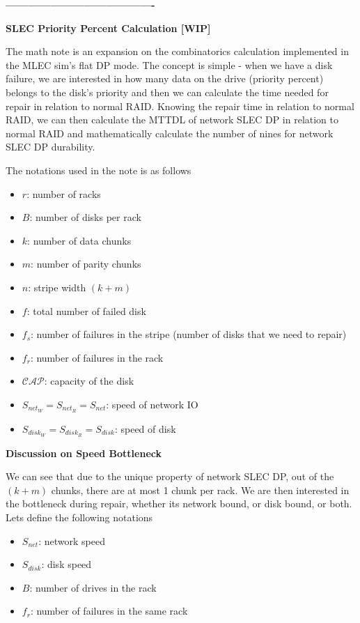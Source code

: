 \documentclass[journal]{IEEEtran}
\begin{document}
\textbf{----------------------------------------}

\textbf{SLEC Priority Percent Calculation [WIP]}

The math note is an expansion on the combinatorics calculation implemented in the MLEC sim's flat DP mode. The concept is simple - when we have a disk failure, we are interested in how many data on the drive (priority percent) belongs to the disk's priority and then we can calculate the time needed for repair in relation to normal RAID. Knowing the repair time in relation to normal RAID, we can then calculate the MTTDL of network SLEC DP in relation to normal RAID and mathematically calculate the number of nines for network SLEC DP durability.\

The notations used in the note is as follows
\begin{itemize}
  \item $r$: number of racks
  \item $B$: number of disks per rack
  \item $k$: number of data chunks
  \item $m$: number of parity chunks
  \item $n$: stripe width $(k+m)$
  \item $f$: total number of failed disk
  \item $f_s$: number of failures in the stripe (number of disks that we need to repair)
  \item $f_r$: number of failures in the rack
  \item $\mathcal{CAP}$: capacity of the disk
  \item $S_{net_W}=S_{net_R}=S_{net}$: speed of network IO
  \item $S_{disk_W}=S_{disk_R}=S_{disk}$: speed of disk
\end{itemize}

\hspace*{1cm}

\textbf{Discussion on Speed Bottleneck}

We can see that due to the unique property of network SLEC DP, out of the $(k+m)$ chunks, there are at most 1 chunk per rack. We are then interested in the bottleneck during repair, whether its network bound, or disk bound, or both. Lets define the following notations
\begin{itemize}
  \item $S_{net}$: network speed
  \item $S_{disk}$: disk speed
  \item $B$: number of drives in the rack
  \item $f_r$: number of failures in the same rack
\end{itemize}
\end{document}
